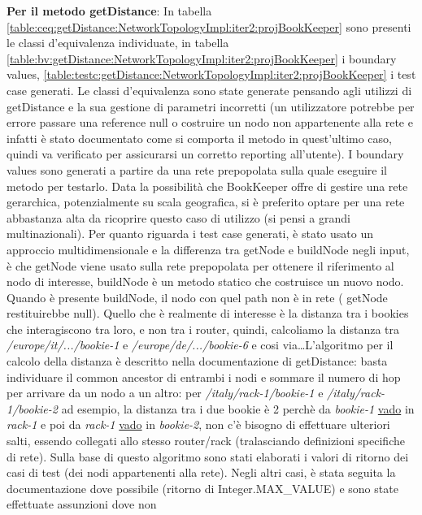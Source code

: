 \documentclass[10pt, a4paper]{article}
\newcommand{\gettablelabel}[5]{table:#1:#2:#3:iter#4:proj#5}
\def\bookkeeper{BookKeeper}
\begin{document}
	\textbf{Per il metodo getDistance}: In tabella 
	\ref{\gettablelabel{ceq}{getDistance}{NetworkTopologyImpl}{2}{\bookkeeper}}
	sono presenti le classi d'equivalenza individuate, in tabella 
	\ref{\gettablelabel{bv}{getDistance}{NetworkTopologyImpl}{2}{\bookkeeper}}
	i boundary values, 
	\ref{\gettablelabel{testc}{getDistance}{NetworkTopologyImpl}{2}{\bookkeeper}}
	i test case generati.
	Le classi d'equivalenza sono state generate pensando agli utilizzi di
	getDistance e la sua gestione di parametri incorretti (un utilizzatore
	potrebbe per errore passare una reference null o costruire un nodo non
	appartenente alla rete e infatti è stato documentato come
	si comporta il metodo in quest'ultimo caso, quindi va verificato per 
	assicurarsi un corretto reporting all'utente). 
	I boundary values sono generati a partire da una
	rete prepopolata sulla quale eseguire il metodo per testarlo.
	Data la possibilità che \bookkeeper\; offre di gestire una rete gerarchica,
	potenzialmente su scala geografica, si è preferito optare per una rete 
	abbastanza alta da ricoprire questo caso di utilizzo (si pensi a grandi
	multinazionali).
	Per quanto riguarda i test case generati, è stato usato un approccio 
	multidimensionale e la differenza tra getNode e buildNode negli input, è
	che getNode viene usato sulla rete prepopolata per ottenere il riferimento
	al nodo di interesse, buildNode è un metodo statico che costruisce un nuovo
	nodo. Quando è presente buildNode, il nodo con quel path non è in rete (
	getNode restituirebbe null). Quello che è realmente di interesse è la distanza
	tra i bookies che interagiscono tra loro, e non tra i router, quindi,
	calcoliamo la distanza tra \textit{/europe/it/.../bookie-1} e 
	\textit{/europe/de/.../bookie-6} e cosi via\dots L'algoritmo per il calcolo 
	della distanza è descritto nella documentazione di getDistance: basta 
	individuare il common ancestor di entrambi i nodi e sommare il numero di hop 
	per arrivare da un nodo a un altro: per \textit{/italy/rack-1/bookie-1} e 
	\textit{/italy/rack-1/bookie-2} ad esempio, la distanza tra i due bookie è 2 
	perchè da \textit{bookie-1} \underline{vado} in \textit{rack-1} e poi da 
	\textit{rack-1} \underline{vado} in \textit{bookie-2}, non c'è bisogno di 
	effettuare ulteriori salti, essendo collegati allo stesso router/rack
	(tralasciando definizioni specifiche di rete). 
	Sulla base di questo algoritmo sono stati elaborati i valori di ritorno
	dei casi di test (dei nodi appartenenti alla rete). Negli altri casi,
	è stata seguita la documentazione dove possibile (ritorno di
	Integer.MAX\_VALUE) e sono state effettuate assunzioni dove non 
\end{document}
